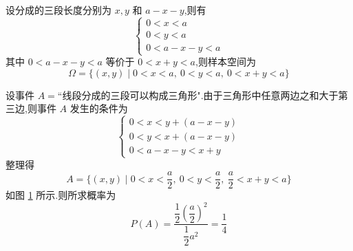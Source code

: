 \begin{solution}
    设分成的三段长度分别为 $x, y$ 和 $a-x-y$,则有
    $$
    \begin{cases}
        0<x<a \\
        0<y<a \\
        0 < a-x-y < a
    \end{cases}
    $$
    其中 $0 < a-x-y < a$ 等价于 $0 < x+y < a$,则样本空间为
    $$
    \varOmega = \{ (x,y) \mid 0<x<a,\ 0<y<a,\ 0 < x+y < a \}
    $$

    设事件 $A = \text{``线段分成的三段可以构成三角形"}$.由于三角形中任意两边之和大于第三边,则事件 $A$ 发生的条件为
    $$
    \begin{cases}
        0 < x < y + (a-x-y) \\
        0 < y < x + (a-x-y) \\
        0 < a-x-y < x+y
    \end{cases}
    $$
    整理得
    $$
    A = \{ (x,y) \mid 0 < x < \dfrac{a}{2},\ 0 < y < \dfrac{a}{2},\ \dfrac{a}{2} < x+y < a \}
    $$
    如图 \ref{fig:example-三角形} 所示.则所求概率为
    $$
    P(A) = \dfrac{\dfrac{1}{2} \left( \dfrac{a}{2} \right)^2}{\dfrac{1}{2} a^2} = \dfrac{1}{4}
    $$

    \begin{figure}[H]
        \centering

        
        \caption{}
        \label{fig:example-三角形}
    \end{figure}
\end{solution}


